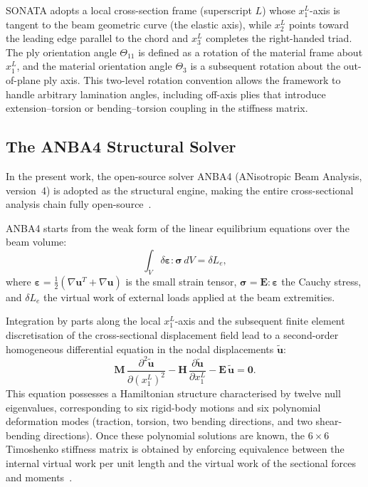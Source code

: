 SONATA adopts a local cross-section frame (superscript $L$) whose $x_1^L$-axis is tangent to the
beam geometric curve (the elastic axis), while $x_2^L$ points toward the leading edge parallel to
the chord and $x_3^L$ completes the right-handed triad.
The ply orientation angle $\Theta_{11}$ is defined as a rotation of the material frame about
$x_1^L$, and the material orientation angle $\Theta_3$ is a subsequent rotation about the
out-of-plane ply axis.
This two-level rotation convention allows the framework to handle arbitrary lamination angles,
including off-axis plies that introduce extension--torsion or bending--torsion coupling in the
stiffness matrix.

\subsection{The ANBA4 Structural Solver}

In the present work, the open-source solver ANBA4 (ANisotropic Beam Analysis, version~4) is
adopted as the structural engine, making the entire cross-sectional analysis chain fully
open-source~\cite{morandini2010anba4,zhu2020multiphysics}.

ANBA4 starts from the weak form of the linear equilibrium equations over the beam volume:
\begin{equation}
    \int_V \delta\boldsymbol{\varepsilon} : \boldsymbol{\sigma}\, dV = \delta L_e,
    \label{eq:anba4_weak}
\end{equation}
where $\boldsymbol{\varepsilon} = \tfrac{1}{2}(\nabla\mathbf{u}^T + \nabla\mathbf{u})$ is the
small strain tensor, $\boldsymbol{\sigma} = \mathbf{E}:\boldsymbol{\varepsilon}$ the Cauchy
stress, and $\delta L_e$ the virtual work of external loads applied at the beam extremities.

Integration by parts along the local $x_1^L$-axis and the subsequent finite element
discretisation of the cross-sectional displacement field lead to a second-order homogeneous
differential equation in the nodal displacements $\tilde{\mathbf{u}}$:
\begin{equation}
    \mathbf{M}\,\frac{\partial^2\tilde{\mathbf{u}}}{\partial(x_1^L)^2}
    - \mathbf{H}\,\frac{\partial\tilde{\mathbf{u}}}{\partial x_1^L}
    - \mathbf{E}\,\tilde{\mathbf{u}} = \mathbf{0}.
    \label{eq:anba4_ode}
\end{equation}
This equation possesses a Hamiltonian structure characterised by twelve null eigenvalues,
corresponding to six rigid-body motions and six polynomial deformation modes (traction, torsion,
two bending directions, and two shear-bending directions).
Once these polynomial solutions are known, the $6\times6$ Timoshenko stiffness matrix is
obtained by enforcing equivalence between the internal virtual work per unit length and the
virtual work of the sectional forces and moments~\cite{morandini2010anba4}.

